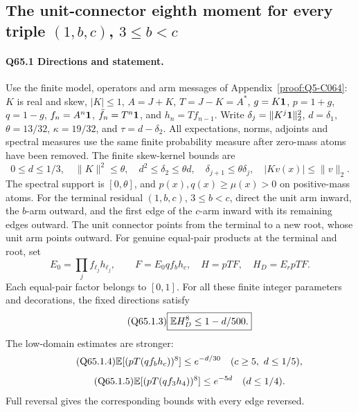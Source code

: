 \subsection{The unit-connector eighth moment for every triple \((1,\allowbreak b,\allowbreak c)\), \(3\le\allowbreak  b<\allowbreak c\)}\label{proof:Q5-C065}

\paragraph{Q65.1 Directions and statement.}
Use the finite model, operators and arm messages of
Appendix~\ref{proof:Q5-C064}: \(K\) is real and skew, \(|K|\le\allowbreak 1\),
\(A=\allowbreak J+K\), \(T=\allowbreak J-K=\allowbreak A^*\), \(g=\allowbreak K\mathbf1\), \(p=\allowbreak 1+g\), \(q=\allowbreak 1-g\),
\(f_n=\allowbreak A^n\mathbf1\), \(\bar f_n=\allowbreak T^n\mathbf1\), and \(h_n=\allowbreak Tf_{n-1}\).
Write \(\delta_j=\allowbreak \|K^j\mathbf1\|_2^2\), \(d=\allowbreak \delta_1\),
\(\theta=\allowbreak 13/32\), \(\kappa=\allowbreak 19/32\), and \(\tau=\allowbreak d-\delta_2\).
All expectations, norms, adjoints and spectral measures use the same
finite probability measure after zero-mass atoms have been removed.
The finite skew-kernel bounds are
\begin{equation}\tag{Q65.1.1}\label{eq:Q65:1.1}
0\le d\le1/3,\quad\|K\|^2\le\theta,\quad
d^2\le\delta_2\le\theta d,\quad\delta_{j+1}\le\theta\delta_j,
\quad |Kv(x)|\le\|v\|_2.
\end{equation}
The spectral support is \([0,\allowbreak \theta]\), and
\(p(x),\allowbreak q(x)\ge\allowbreak \mu(x)>\allowbreak 0\) on positive-mass atoms.
For the terminal residual \((1,\allowbreak b,\allowbreak c)\), \(3\le\allowbreak  b<\allowbreak c\), direct the
unit arm inward, the \(b\)-arm outward, and the first edge of the
\(c\)-arm inward with its remaining edges outward. The unit connector
points from the terminal to a new root, whose unit arm points outward.
For genuine equal-pair products at the terminal and root, set
\begin{equation}\tag{Q65.1.2}\label{eq:Q65:1.2}
E_0=\prod_jf_{\ell_j}h_{\ell_j},\qquad
F=E_0qf_bh_c,\quad H=pTF,\quad H_D=E_rpTF.
\end{equation}
Each equal-pair factor belongs to \([0,\allowbreak 1]\). For all these finite
integer parameters and decorations, the fixed directions satisfy
\begin{equation}\tag{Q65.1.3}\label{eq:Q65:1.3}
\boxed{\mathbb E H_D^8\le1-d/500.}
\end{equation}
The low-domain estimates are stronger:
\begin{equation}\tag{Q65.1.4}\label{eq:Q65:1.4}
\mathbb E[(pT(qf_bh_c))^8]\le e^{-d/30}
\quad(c\ge5,\ d\le1/5),
\end{equation}
\begin{equation}\tag{Q65.1.5}\label{eq:Q65:1.5}
\mathbb E[(pT(qf_3h_4))^8]\le e^{-5d}\quad(d\le1/4).
\end{equation}
Full reversal gives the corresponding bounds with every edge reversed.

